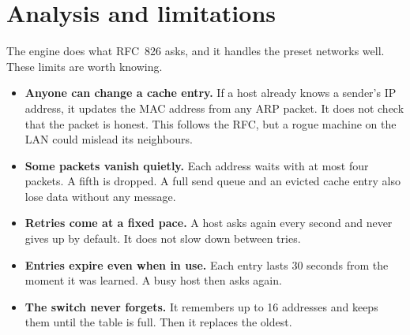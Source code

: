\section{Analysis and limitations}\label{sec:analysis}

The engine does what RFC~826 asks, and it handles the preset networks well. These limits are worth knowing.

\begin{itemize}[nosep]
  \item \textbf{Anyone can change a cache entry.} If a host already knows a sender's IP address, it updates the MAC address from any ARP packet. It does not check that the packet is honest. This follows the RFC, but a rogue machine on the LAN could mislead its neighbours.
  \item \textbf{Some packets vanish quietly.} Each address waits with at most four packets. A fifth is dropped. A full send queue and an evicted cache entry also lose data without any message.
  \item \textbf{Retries come at a fixed pace.} A host asks again every second and never gives up by default. It does not slow down between tries.
  \item \textbf{Entries expire even when in use.} Each entry lasts 30 seconds from the moment it was learned. A busy host then asks again.
  \item \textbf{The switch never forgets.} It remembers up to 16 addresses and keeps them until the table is full. Then it replaces the oldest.
\end{itemize}
